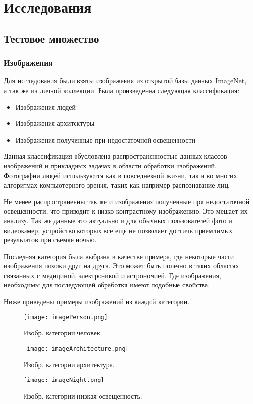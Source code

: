 \section{Исследования}
\subsection{Тестовое множество}
\subsubsection{Изображения}
Для исследования были взяты изображения из открытой базы данных ImageNet, а так же из личной коллекции. Была произведенна следующая классификация:
\begin{itemize}
	\item Изображения людей
	\item Изображения архитектуры
	\item Изображения полученные при недостаточной освещенности
\end{itemize}
Данная классификация обусловлена распространенностью данных классов изображений и прикладных задачах в области обработки изображений. Фотографии людей используются как в повседневной жизни, так и во многих алгоритмах компьютерного зрения, таких как например распознавание лиц.

Не менее распространенны так же и изображения полученные при недостаточной освещенности, что приводит к низко контрастному изображению. Это мешает их анализу. Так же данные это актуально и для обычных пользователей фото и видеокамер, устройство которых все еще не позволяет достичь приемлимых результатов при съемке ночью. 

Последняя категория была выбрана в качестве примера, где  некоторые части изображения похожи друг на друга. Это может быть полезно в таких областях связанных с медициной, электроникой и астрономией. Где изображения, необходимы для последующей обработки имеют подобные свойства.

Ниже приведены примеры изображений из каждой категории.
\begin{figure}[H]
	\begin{center}
		\begin{minipage}[h]{0.5\linewidth}
			\texttt{[image: imagePerson.png]}
			\caption{Изобр. категории человек.} %
			\label{img:imPerson} %
		\end{minipage}
		\hfill 
		\begin{minipage}[h]{0.5\linewidth}
			\texttt{[image: imageArchitecture.png]}
			\caption{Изобр. категории архитектура.}
			\label{img:imArchitecture}
		\end{minipage}
		\hfill 
		\begin{minipage}[h]{0.5\linewidth}
			\texttt{[image: imageNight.png]}
			\caption{Изобр. категории низкая освещенность.}
			\label{ris:experimcoded}
		\end{minipage}
	\end{center}
\end{figure}

